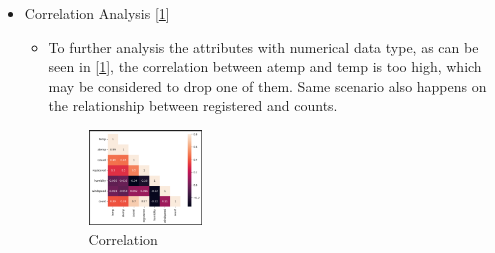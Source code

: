 \begin{itemize}
  \item Correlation Analysis [\ref{fig:correlation}]
   \begin{itemize}
    \item To further analysis the attributes with numerical data type, as can be seen in [\ref{fig:correlation}], the correlation between atemp and temp is too high, which may be considered to drop one of them. Same scenario also happens on the relationship between registered and counts.
     \begin{figure}[!ht]
    	\centering
    	\setlength{\abovecaptionskip}{0.cm}
    	\setlength{\belowcaptionskip}{-0.cm}
    	\includegraphics[width=0.3\textwidth]{./figures/Correlation.png}
    	\caption{Correlation}
    	\label{fig:correlation}
    \end{figure}
  \end{itemize}
  

\end{itemize}
